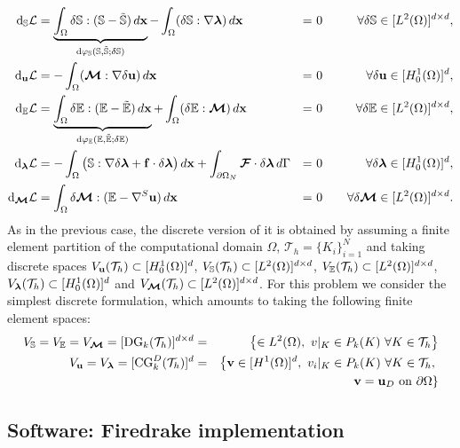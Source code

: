 \begin{equation*}
        \begin{aligned}
               \text{d}_{\mathbb{S}}\mathcal{L}  & = \underbrace{\int_{\Omega}  \delta \mathbb{S} : (\mathbb{S} - \tilde{\mathbb{S}}) \, d\mathbf{x}}_{\text{d}\varphi_{\mathbb{S}}(\mathbb{S},\tilde{\mathbb{S}}; \delta{\mathbb{S}})} - \int_{\Omega}(\delta \mathbb{S} : \nabla \boldsymbol{\lambda} ) \, d\mathbf{x} & = & ~0 &\quad \forall \delta \mathbb{S} \in  [L^2(\Omega)]^{d\times d}, \\
               \text{d}_{\mathbf{u}}\mathcal{L} & = - \int_{\Omega}( \boldsymbol{\mathcal{M}} : \nabla \delta \mathbf{u} ) \, d\mathbf{x} & = & ~0 &\quad \forall \delta \mathbf{u} \in [H_0^1(\Omega)]^d, \\
                \text{d}_{\mathbb{E}}\mathcal{L} & = \underbrace{\int_{\Omega}  \delta \mathbb{E} : (\mathbb{E} - \tilde{\mathbb{E}}) \, d\mathbf{x}}_{\text{d}\varphi_{\mathbb{E}}(\mathbb{E},\tilde{\mathbb{E}}; \delta{\mathbb{E}})}  + \int_{\Omega} (\delta \mathbb{E} : \boldsymbol{\mathcal{M}}) \, d\mathbf{x} & = & ~0 &\quad \forall \delta \mathbb{E} \in  [L^2(\Omega)]^{d\times d}, \\
                \text{d}_{\boldsymbol{\lambda}}\mathcal{L} & = -\int_{\Omega} \big(\mathbb{S} : \nabla \delta \boldsymbol{\lambda} + \mathbf{f} \cdot \delta \boldsymbol{\lambda} \big) \, d\mathbf{x} + \int_{\partial{\Omega}_N} {\boldsymbol{\mathcal{F}}\cdot \delta\boldsymbol{\lambda}}\,d\Gamma & = & ~0 &\quad \forall \delta \boldsymbol{\lambda} \in [H_0^1(\Omega)]^d, \\
                \text{d}_{\boldsymbol{\mathcal{M}}}\mathcal{L} & = \int_{\Omega} \delta \boldsymbol{\mathcal{M}} : (\mathbb{E} -  \nabla^S \mathbf{u}) \, d\mathbf{x} & = & ~0 &\quad \forall \delta \boldsymbol{\mathcal{M}} \in  [L^2(\Omega)]^{d\times d}.
        \end{aligned}
\end{equation*}
As in the previous case, the discrete version of it is obtained by assuming a
finite element partition of the computational domain $\Omega$, $\mathcal{T}_h = \{K_i\}_{i=1}^N$
and taking discrete spaces 
$V_{\mathbf{u}}(\mathcal{T}_h) \subset [H_0^1(\Omega)]^{d}$, $V_{\mathbb{S}}(\mathcal{T}_h) \subset [L^2(\Omega)]^{d \times d}$,
$V_{\mathbb{E}}(\mathcal{T}_h) \subset [L^2(\Omega)]^{d\times d}$, $V_{\boldsymbol{\lambda}}(\mathcal{T}_h) \subset [H_0^1(\Omega)]^d$
and $V_{\boldsymbol{\mathcal{M}}}(\mathcal{T}_h) \subset [L^2(\Omega)]^{d\times d}$.
For this problem we consider the simplest discrete formulation, which amounts to taking
the following finite element spaces:
\begin{eqnarray}
  V_{\mathbb{S}} = V_{\mathbb{E}} = V_{\boldsymbol{\mathcal{M}}} = [\text{DG}_k(\mathcal{T}_h)]^{d \times d} & = & \left \{  \in L^2(\Omega),~ v|_K \in P_k(K)~\forall K \in \mathcal{T}_h \right \}\\
  V_{\mathbf{u}} = V_{\boldsymbol{\lambda}} = [\text{CG}_k^D(\mathcal{T}_h)]^d & = & \left \{ \mathbf{v} \in [H^1(\Omega)]^d,~ {v_i}|_K \in P_k(K)~\forall K \in \mathcal{T}_h, \right . \nonumber \\
  && \left. ~\mathbf{v} = \mathbf{u}_D~\mbox{on}~\partial{\Omega} \right \}
\end{eqnarray}




\subsection{Software: Firedrake implementation}





